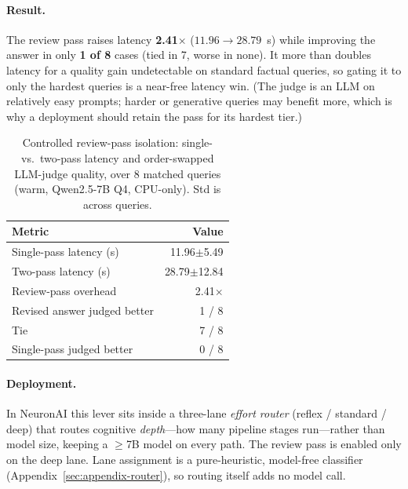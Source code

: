 \documentclass[10pt,twocolumn]{article}
\begin{document}
\paragraph{Result.}
The review pass raises latency \textbf{2.41$\times$}
($11.96\rightarrow28.79$~s) while improving the answer in only \textbf{1 of
8} cases (tied in 7, worse in none). It more than doubles latency for a
quality gain undetectable on standard factual queries, so gating it to only
the hardest queries is a near-free latency win. (The judge is an LLM on
relatively easy prompts; harder or generative queries may benefit more,
which is why a deployment should retain the pass for its hardest tier.)

\begin{table}[t]
  \centering
  \caption{Controlled review-pass isolation: single- vs.\ two-pass latency
  and order-swapped LLM-judge quality, over 8 matched queries (warm,
  Qwen2.5-7B Q4, CPU-only). Std is across queries.}
  \label{tab:reviewpass}
  \small
  \begin{tabular}{lr}
    \toprule
    Metric & Value \\
    \midrule
    Single-pass latency (s)       & 11.96$\pm$5.49 \\
    Two-pass latency (s)          & 28.79$\pm$12.84 \\
    Review-pass overhead          & 2.41$\times$ \\
    \midrule
    Revised answer judged better  & 1 / 8 \\
    Tie                           & 7 / 8 \\
    Single-pass judged better     & 0 / 8 \\
    \bottomrule
  \end{tabular}
\end{table}

\paragraph{Deployment.}
In NeuronAI this lever sits inside a three-lane \emph{effort router} (reflex
/ standard / deep) that routes cognitive \emph{depth}---how many pipeline
stages run---rather than model size, keeping a $\geq$7B model on every path.
The review pass is enabled only on the deep lane. Lane assignment is a
pure-heuristic, model-free classifier (Appendix~\ref{sec:appendix-router}),
so routing itself adds no model call.

\end{document}
